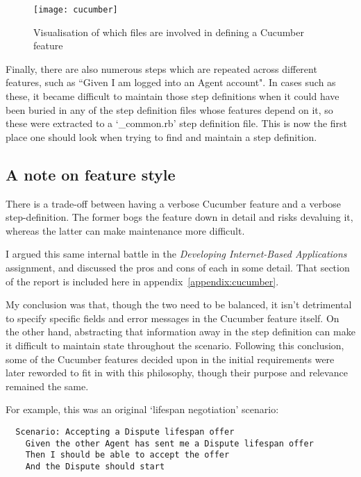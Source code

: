 \begin{figure}[h!]
  \centering
    \ifimages
    \texttt{[image: cucumber]}
    \fi
  \caption{Visualisation of which files are involved in defining a Cucumber feature}
  \label{uml:cucumber}
\end{figure}

Finally, there are also numerous steps which are repeated across different features, such as ``Given I am logged into an Agent account". In cases such as these, it became difficult to maintain those step definitions when it could have been buried in any of the step definition files whose features depend on it, so these were extracted to a `\_common.rb' step definition file. This is now the first place one should look when trying to find and maintain a step definition.

\subsection{A note on feature style}

There is a trade-off between having a verbose Cucumber feature and a verbose step-definition. The former bogs the feature down in detail and risks devaluing it, whereas the latter can make maintenance more difficult.

I argued this same internal battle in the \emph{Developing Internet-Based Applications} assignment, and discussed the pros and cons of each in some detail. That section of the report is included here in appendix~\ref{appendix:cucumber}.

My conclusion was that, though the two need to be balanced, it isn't detrimental to specify specific fields and error messages in the Cucumber feature itself. On the other hand, abstracting that information away in the step definition can make it difficult to maintain state throughout the scenario. Following this conclusion, some of the Cucumber features decided upon in the initial requirements were later reworded to fit in with this philosophy, though their purpose and relevance remained the same.

For example, this was an original `lifespan negotiation' scenario:

\begin{lstlisting}
  Scenario: Accepting a Dispute lifespan offer
    Given the other Agent has sent me a Dispute lifespan offer
    Then I should be able to accept the offer
    And the Dispute should start
\end{lstlisting}

